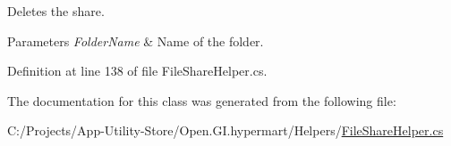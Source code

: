 Deletes the share. 


\begin{DoxyParams}{Parameters}
{\em Folder\+Name} & Name of the folder.\\
\hline
\end{DoxyParams}


Definition at line 138 of file File\+Share\+Helper.\+cs.



The documentation for this class was generated from the following file\+:\begin{DoxyCompactItemize}
\item 
C\+:/\+Projects/\+App-\/\+Utility-\/\+Store/\+Open.\+G\+I.\+hypermart/\+Helpers/\hyperlink{_file_share_helper_8cs}{File\+Share\+Helper.\+cs}\end{DoxyCompactItemize}
